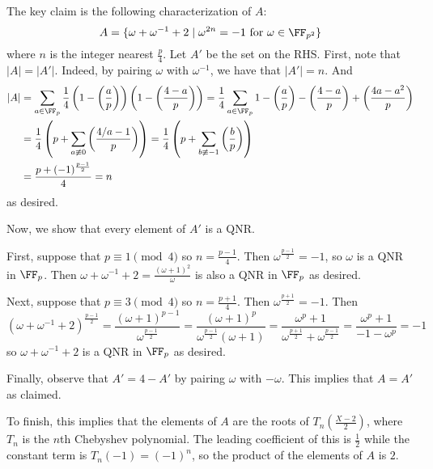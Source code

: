 The key claim is the following characterization of $A$:
\[
	A=\{\omega+\omega^{-1}+2 \mid \omega^{2n}=-1\text{ for }\omega\in\FF_{p^2}\}
\]
where $n$ is the integer nearest $\frac{p}{4}$. Let $A'$ be the set on the RHS. First, note that $|A|=|A'|$. Indeed, by pairing $\omega$ with $\omega^{-1}$, we have that $|A'|=n$. And
\begin{align*}
	|A| &= \sum_{a\in\FF_p}\frac{1}{4}\left(1-\left(\frac{a}{p}\right)\right)\left(1-\left(\frac{4-a}{p}\right)\right) = \frac{1}{4}\sum_{a\in\FF_p}1-\left(\frac{a}{p}\right)-\left(\frac{4-a}{p}\right)+\left(\frac{4a-a^2}{p}\right) \\
	&= \frac{1}{4}\left(p+\sum_{a\not\equiv0}\left(\frac{4/a-1}{p}\right)\right) = \frac{1}{4}\left(p+\sum_{b\not\equiv-1}\left(\frac{b}{p}\right)\right) \\
	&= \frac{p+(-1)^{\frac{p-1}{2}}}{4} = n
\end{align*}
as desired.

Now, we show that every element of $A'$ is a QNR.

First, suppose that $p\equiv1\pmod4$ so $n=\frac{p-1}{4}$. Then $\omega^{\frac{p-1}{2}}=-1$, so $\omega$ is a QNR in $\FF_p$. Then $\omega+\omega^{-1}+2=\frac{(\omega+1)^2}{\omega}$ is also a QNR in $\FF_p$ as desired.

Next, suppose that $p\equiv3\pmod4$ so $n=\frac{p+1}{4}$. Then $\omega^{\frac{p+1}{2}}=-1$. Then
\[
	(\omega+\omega^{-1}+2)^{\frac{p-1}{2}}=\frac{(\omega+1)^{p-1}}{\omega^{\frac{p-1}{2}}}=\frac{(\omega+1)^p}{\omega^{\frac{p-1}{2}}(\omega+1)}=\frac{\omega^p+1}{\omega^{\frac{p+1}{2}}+\omega^{\frac{p-1}{2}}}=\frac{\omega^p+1}{-1-\omega^p}=-1
\]
so $\omega+\omega^{-1}+2$ is a QNR in $\FF_p$ as desired.

Finally, observe that $A'=4-A'$ by pairing $\omega$ with $-\omega$. This implies that $A=A'$ as claimed.

To finish, this implies that the elements of $A$ are the roots of $T_n\left(\frac{X-2}{2}\right)$, where $T_n$ is the $n$th Chebyshev polynomial. The leading coefficient of this is $\frac{1}{2}$ while the constant term is $T_n(-1)=(-1)^n$, so the product of the elements of $A$ is $2$.